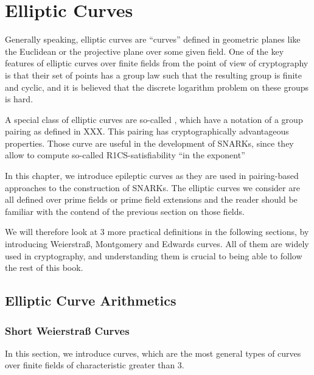 \chapter{Elliptic Curves}\label{chap:elliptic-curves}

Generally speaking, elliptic curves are ``curves'' defined in geometric planes like the Euclidean or the projective plane over some given field. One of the key features of elliptic curves over finite fields from the point of view of cryptography is that their set of points has a group law such that the resulting group is finite and cyclic, and it is believed that the discrete logarithm problem on these groups is hard. 

A special class of elliptic curves are so-called , which have a notation of a group pairing as defined in XXX. This pairing has cryptographically advantageous properties. Those curve are useful in the development of SNARKs, since they allow to compute so-called R1CS-satisfiability ``in the exponent'' 

In this chapter, we introduce epileptic curves as they are used in pairing-based approaches to the construction of SNARKs. The elliptic curves we consider are all defined over prime fields or prime field extensions and the reader should be familiar with the contend of the previous section on those fields.

 We will therefore look at $3$ more practical definitions in the following sections, by introducing Weierstraß, Montgomery and Edwards curves. All of them are widely used in cryptography, and understanding them is crucial to being able to follow the rest of this book.

\section{Elliptic Curve Arithmetics}

\subsection{Short Weierstraß Curves}
In this section, we introduce curves, which are the most general types of curves over finite fields of characteristic greater than $3$. 

